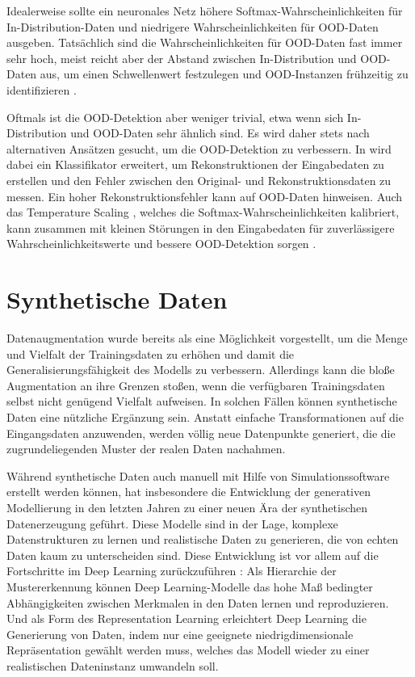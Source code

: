 Idealerweise sollte ein neuronales Netz höhere Softmax-Wahrscheinlichkeiten für In-Distribution-Daten und niedrigere Wahrscheinlichkeiten für OOD-Daten ausgeben. Tatsächlich sind die Wahrscheinlichkeiten für OOD-Daten fast immer sehr hoch, meist reicht aber der Abstand zwischen In-Distribution und OOD-Daten aus, um einen Schwellenwert festzulegen und OOD-Instanzen frühzeitig zu identifizieren \parencite{Hendrycks2018baselineooddetection}.

Oftmals ist die OOD-Detektion aber weniger trivial, etwa wenn sich In-Distribution und OOD-Daten sehr ähnlich sind. Es wird daher stets nach alternativen Ansätzen gesucht, um die OOD-Detektion zu verbessern. In \parencite{Hendrycks2018baselineooddetection} wird dabei ein Klassifikator erweitert, um Rekonstruktionen der Eingabedaten zu erstellen und den Fehler zwischen den Original- und Rekonstruktionsdaten zu messen. Ein hoher Rekonstruktionsfehler kann auf OOD-Daten hinweisen. Auch das Temperature Scaling \parencite{Guo2017tempscaling}, welches die Softmax-Wahrscheinlichkeiten kalibriert, kann zusammen mit kleinen Störungen in den Eingabedaten für zuverlässigere Wahrscheinlichkeitswerte und bessere OOD-Detektion sorgen \parencite{Liang2020odin}.

\section{Synthetische Daten} \label{sec:synt-data}

Datenaugmentation wurde bereits als eine Möglichkeit vorgestellt, um die Menge und Vielfalt der Trainingsdaten zu erhöhen und damit die Generalisierungsfähigkeit des Modells zu verbessern. Allerdings kann die bloße Augmentation an ihre Grenzen stoßen, wenn die verfügbaren Trainingsdaten selbst nicht genügend Vielfalt aufweisen. In solchen Fällen können synthetische Daten eine nützliche Ergänzung sein. Anstatt einfache Transformationen auf die Eingangsdaten anzuwenden, werden völlig neue Datenpunkte generiert, die die zugrundeliegenden Muster der realen Daten nachahmen.

Während synthetische Daten auch manuell mit Hilfe von Simulationssoftware erstellt werden können, hat insbesondere die Entwicklung der generativen Modellierung in den letzten Jahren zu einer neuen Ära der synthetischen Datenerzeugung geführt. Diese Modelle sind in der Lage, komplexe Datenstrukturen zu lernen und realistische Daten zu generieren, die von echten Daten kaum zu unterscheiden sind. Diese Entwicklung ist vor allem auf die Fortschritte im Deep Learning zurückzuführen \parencite{Foster2020gendeeplearning}: Als Hierarchie der Mustererkennung können Deep Learning-Modelle das hohe Maß bedingter Abhängigkeiten zwischen Merkmalen in den Daten lernen und reproduzieren. Und als Form des Representation Learning erleichtert Deep Learning die Generierung von Daten, indem nur eine geeignete niedrigdimensionale Repräsentation gewählt werden muss, welches das Modell wieder zu einer realistischen Dateninstanz umwandeln soll.

